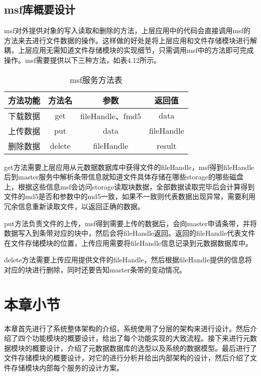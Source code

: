 \subsection{msf库概要设计}

msf对外提供对象的写入读取和删除的方法，上层应用中的代码会直接调用msf的方法来去进行文件数据的操作。这样做的好处是将上层应用和文件存储模块进行解耦，上层应用无需知道文件存储模块的实现细节，只需调用msf中的方法即可完成操作。msf需要提供以下三种方法，如表4.12所示。

\begin{table}[h]
  \centering
  \caption{msf服务方法表}
  \begin{tabular}{cccc}
    \toprule
    方法功能   & 方法名    & 参数     & 返回值               \\
    \midrule
    下载数据      & get    & fileHandle、fmd5  & data       \\
    \addlinespace
    上传数据      & put    & data              & fileHandle \\
    \addlinespace
    删除数据      & delete & fileHandle        & result     \\
    \bottomrule
  \end{tabular}
\end{table}	

get方法需要上层应用从元数据数据库中获得文件的fileHandle，msf得到fileHandle后到master服务中解析条带信息就知道文件具体存储在哪些storage的哪些磁盘上，根据这些信息msf会访问storage读取块数据，全部数据读取完毕后会计算得到文件的md5是否和参数中的md5一致，如果不一致则代表数据出现异常，需要利用冗余信息重新读取文件，以返回正确的数据。

put方法负责文件的上传，msf得到需要上传的数据后，会向master申请条带，并将数据写入到条带对应的块中，然后会将fileHandle返回。返回的fileHandle代表文件在文件存储模块的位置，上传应用需要将fileHandle信息记录到元数据数据库中。

delete方法需要上传应用提供文件的fileHandle，然后根据fileHandle提供的信息将对应的块进行删除，同时还要告知master条带的变动情况。

\section{本章小节}
本章首先进行了系统整体架构的介绍，系统使用了分层的架构来进行设计。然后介绍了四个功能模块的概要设计，给出了每个功能实现的大致流程。接下来进行元数据模块的概要设计，介绍了元数据数据库的选型以及系统的数据模型。最后进行了文件存储模块的概要设计，对它的进行分析并给出内部架构的设计，然后介绍了文件存储模块内部每个服务的设计方案。